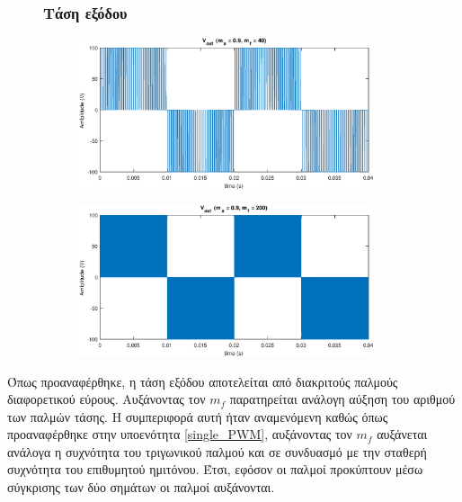\begin{figure}[h!]
	\subsubsection*{Τάση εξόδου}
	\begin{subfigure}{0.49\textwidth}
		\centering
		\includegraphics[width=0.95\textwidth]{Images/V_out_40}
	\end{subfigure}
	\begin{subfigure}{0.49\textwidth}
		\centering
		\includegraphics[width=0.95\textwidth]{Images/V_out_200}
	\end{subfigure}
\end{figure}
\noindent
Όπως προαναφέρθηκε, η τάση εξόδου αποτελείται από διακριτούς παλμούς διαφορετικού εύρους. Αυξάνοντας τον $m_f$ παρατηρείται ανάλογη αύξηση του αριθμού των παλμών τάσης.  Η συμπεριφορά  αυτή ήταν αναμενόμενη καθώς όπως προαναφέρθηκε στην υποενότητα \ref{single_PWM}, αυξάνοντας τον $m_f$ αυξάνεται ανάλογα η συχνότητα του τριγωνικού παλμού και σε συνδυασμό με την σταθερή συχνότητα του επιθυμητού ημιτόνου. Έτσι, εφόσον οι παλμοί προκύπτουν μέσω σύγκρισης των δύο σημάτων οι παλμοί αυξάνονται.\\
